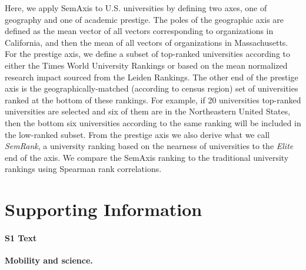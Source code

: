 \documentclass[12pt]{article} %
\newcommand{\beginsupplement}{%
        \setcounter{table}{0}
        \renewcommand{\thetable}{S\arabic{table}}%
        \setcounter{figure}{0}
        \renewcommand{\thefigure}{S\arabic{figure}}%
     }
\begin{document}
Here, we apply SemAxis to U.S. universities by defining two axes, one of geography and one of academic prestige.
The poles of the geographic axis are defined as the mean vector of all vectors corresponding to organizations in California, and then the mean of all vectors of organizations in Massachusetts.
For the prestige axis, we define a subset of top-ranked universities according to either the Times World University Rankings or based on the mean normalized research impact sourced from the Leiden Rankings.
The other end of the prestige axis is the geographically-matched (according to census region) set of universities ranked at the bottom of these rankings.
For example, if 20 universities top-ranked universities are selected and six of them are in the Northeastern United States, then the bottom six universities according to the same ranking will be included in the low-ranked subset.
From the prestige axis we also derive what we call \textit{SemRank}, a university ranking based on the nearness of universities to the \textit{Elite} end of the axis.
We compare the SemAxis ranking to the traditional university rankings using Spearman rank correlations.


\clearpage
\beginsupplement
\section{Supporting Information}



%
%
\paragraph*{S1 Text}
\label{si:text:mobility_science}
{\bf Mobility and science.}
\end{document}
